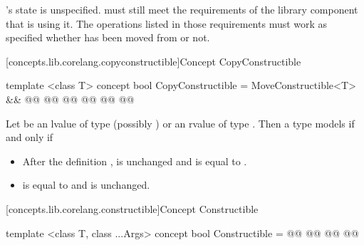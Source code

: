 \begin{addedblock}
\begin{itemdescr}
\pnum
{}'s state is unspecified. \enternote {} must still meet the
requirements of the library component that is using it. The operations listed
in those requirements must work as specified whether  has been moved
from or not.\exitnote
\end{itemdescr}

[concepts.lib.corelang.copyconstructible]{Concept CopyConstructible}

%
\begin{itemdecl}
template <class T>
concept bool CopyConstructible =
  MoveConstructible<T> && @@
  @@
    @@
    @@
    @@
  @\newtxt{\};}@
\end{itemdecl}

\begin{itemdescr}
\pnum
Let  be an lvalue of type (possibly )  or an rvalue
of type . Then a type  models  if
and only if

\begin{itemize}
\item After the definition ,  is unchanged and is equal
to .
\item {} is equal to  and  is unchanged.
\end{itemize}
\end{itemdescr}

[concepts.lib.corelang.constructible]{Concept Constructible}

%
\begin{itemdecl}
template <class T, class ...Args>
concept bool Constructible =
  @@
  @@
    @@
  @\newtxt{\};}@
\end{itemdecl}

\begin{itemdescr}
\end{itemdescr}


\end{addedblock}
